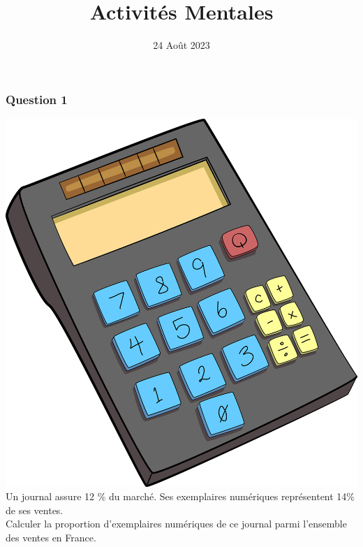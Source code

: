 \documentclass[15pt, mathserif]{beamer}
\title{Activités Mentales}
\date{24 Août 2023}
\begin{document}
\begin{frame}
    \titlepage
\end{frame}

\begin{frame} 
	\frametitle{Question 1}
\includegraphics[scale=0.01]{calculatrice} Un journal assure 12 \% du marché. Ses exemplaires numériques représentent 14\% de ses ventes. \\ Calculer la proportion d'exemplaires numériques de ce journal parmi l'ensemble des ventes en France.\end{frame}
\end{document}

